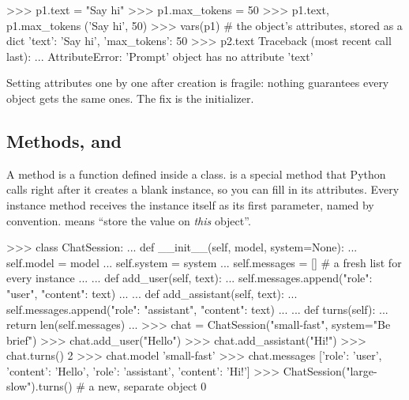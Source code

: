 \begin{pycode}
>>> p1.text = "Say hi"
>>> p1.max_tokens = 50
>>> p1.text, p1.max_tokens
('Say hi', 50)
>>> vars(p1)                 # the object's attributes, stored as a dict
{'text': 'Say hi', 'max_tokens': 50}
>>> p2.text
Traceback (most recent call last):
  ...
AttributeError: 'Prompt' object has no attribute 'text'
\end{pycode}

Setting attributes one by one after creation is fragile: nothing guarantees every object gets
the same ones. The fix is the initializer.

\subsection{Methods,  and }

A method is a function defined inside a class.  is a special method that Python
calls right after it creates a blank instance, so you can fill in its attributes. Every
instance method receives the instance itself as its first parameter, named  by
convention.  means ``store the value on \emph{this} object''.

\begin{center}
\end{center}

\begin{pycode}
>>> class ChatSession:
...     def __init__(self, model, system=None):
...         self.model = model
...         self.system = system
...         self.messages = []              # a fresh list for every instance
...
...     def add_user(self, text):
...         self.messages.append({"role": "user", "content": text})
...
...     def add_assistant(self, text):
...         self.messages.append({"role": "assistant", "content": text})
...
...     def turns(self):
...         return len(self.messages)
...
>>> chat = ChatSession("small-fast", system="Be brief")
>>> chat.add_user("Hello")
>>> chat.add_assistant("Hi!")
>>> chat.turns()
2
>>> chat.model
'small-fast'
>>> chat.messages
[{'role': 'user', 'content': 'Hello'},
 {'role': 'assistant', 'content': 'Hi!'}]
>>> ChatSession("large-slow").turns()       # a new, separate object
0
\end{pycode}


